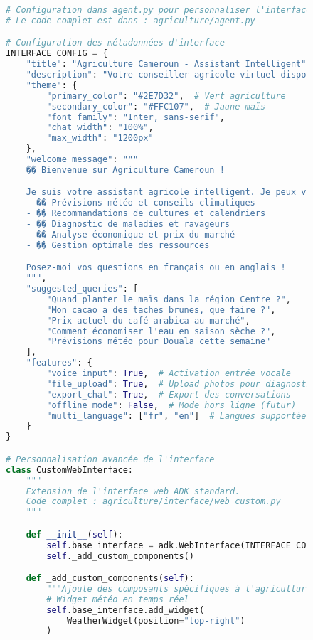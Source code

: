 \begin{figure}[h]
\centering
\begin{lstlisting}[language=Python, caption=Configuration de l'interface web ADK]
# Configuration dans agent.py pour personnaliser l'interface
# Le code complet est dans : agriculture/agent.py

# Configuration des métadonnées d'interface
INTERFACE_CONFIG = {
    "title": "Agriculture Cameroun - Assistant Intelligent",
    "description": "Votre conseiller agricole virtuel disponible 24/7",
    "theme": {
        "primary_color": "#2E7D32",  # Vert agriculture
        "secondary_color": "#FFC107",  # Jaune maïs
        "font_family": "Inter, sans-serif",
        "chat_width": "100%",
        "max_width": "1200px"
    },
    "welcome_message": """
    �� Bienvenue sur Agriculture Cameroun !

    Je suis votre assistant agricole intelligent. Je peux vous aider avec :
    - ��️ Prévisions météo et conseils climatiques
    - �� Recommandations de cultures et calendriers
    - �� Diagnostic de maladies et ravageurs
    - �� Analyse économique et prix du marché
    - �� Gestion optimale des ressources

    Posez-moi vos questions en français ou en anglais !
    """,
    "suggested_queries": [
        "Quand planter le maïs dans la région Centre ?",
        "Mon cacao a des taches brunes, que faire ?",
        "Prix actuel du café arabica au marché",
        "Comment économiser l'eau en saison sèche ?",
        "Prévisions météo pour Douala cette semaine"
    ],
    "features": {
        "voice_input": True,  # Activation entrée vocale
        "file_upload": True,  # Upload photos pour diagnostic
        "export_chat": True,  # Export des conversations
        "offline_mode": False,  # Mode hors ligne (futur)
        "multi_language": ["fr", "en"]  # Langues supportées
    }
}

# Personnalisation avancée de l'interface
class CustomWebInterface:
    """
    Extension de l'interface web ADK standard.
    Code complet : agriculture/interface/web_custom.py
    """

    def __init__(self):
        self.base_interface = adk.WebInterface(INTERFACE_CONFIG)
        self._add_custom_components()

    def _add_custom_components(self):
        """Ajoute des composants spécifiques à l'agriculture."""
        # Widget météo en temps réel
        self.base_interface.add_widget(
            WeatherWidget(position="top-right")
        )


\end{lstlisting}
\end{figure}

